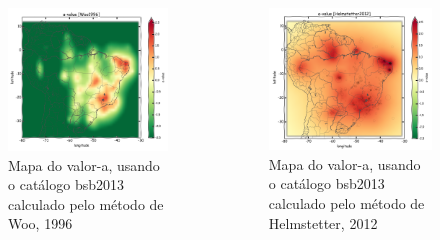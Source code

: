 \documentclass[final]{beamer}
\begin{document}
\begin{poster}
\begin{columns}[t,totalwidth=\textwidth]
\begin{figure}[H]
  \centering
  \includegraphics[width=.98\textwidth]{a_woo} 
  \caption{Mapa do valor-a, usando o catálogo \gls{bsb2013} calculado pelo método de Woo, 1996 }
  \label{fig:a_woo} 
\end{figure}

\begin{figure}[H]
  \centering
  \includegraphics[width=.98\textwidth]{a_helmstetter} 
  \caption{Mapa do valor-a, usando o catálogo \gls{bsb2013} calculado pelo método de Helmstetter, 2012 }
  \label{fig:helm_r} 
\end{figure}




\end{columns}
\end{poster}
\end{document}
